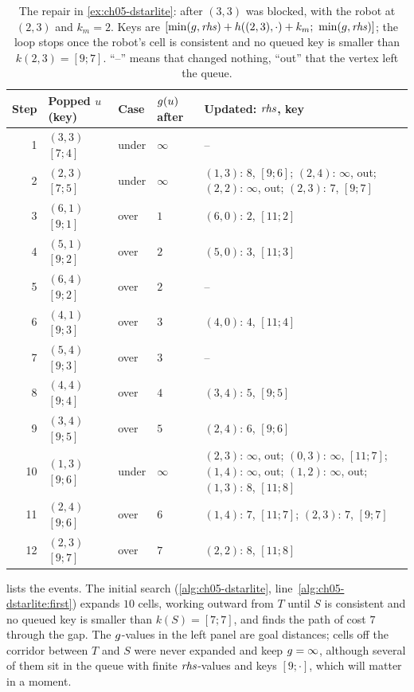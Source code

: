 \begin{table}[htbp]
  \centering\footnotesize
  \caption{The repair in \cref{ex:ch05-dstarlite}: \protect\DslComputeShortestPath after $(3,3)$
  was blocked, with the robot at $(2,3)$ and $k_m=2$. Keys are
  $[\min(\gcost,\rhs)+\hcost((2,3),\cdot)+k_m;\ \min(\gcost,\rhs)]$; the loop stops once
  the robot's cell is consistent and no queued key is smaller than $k(2,3)=[9;7]$.
  ``--'' means that \protect\DslUpdateVertex changed nothing, ``out'' that the vertex left the
  queue.}
  \label{tab:ch05-dstarlite-repair}
  \begin{tabular}{@{}rlllL{6.6cm}@{}}
  \toprule
  Step & Popped $u$ (key) & Case & $g(u)$ after & Updated: $\mathit{rhs}$, key\\
   & $(3,3)$ $[7;4]$ & under & $\infty$ & --\\
  2 & $(2,3)$ $[7;5]$ & under & $\infty$ & $(1,3)$: $8$, $[9;6]$; $(2,4)$: $\infty$, out; $(2,2)$: $\infty$, out; $(2,3)$: $7$, $[9;7]$\\
  3 & $(6,1)$ $[9;1]$ & over & $1$ & $(6,0)$: $2$, $[11;2]$\\
  4 & $(5,1)$ $[9;2]$ & over & $2$ & $(5,0)$: $3$, $[11;3]$\\
  5 & $(6,4)$ $[9;2]$ & over & $2$ & --\\
  6 & $(4,1)$ $[9;3]$ & over & $3$ & $(4,0)$: $4$, $[11;4]$\\
  7 & $(5,4)$ $[9;3]$ & over & $3$ & --\\
  8 & $(4,4)$ $[9;4]$ & over & $4$ & $(3,4)$: $5$, $[9;5]$\\
  9 & $(3,4)$ $[9;5]$ & over & $5$ & $(2,4)$: $6$, $[9;6]$\\
  10 & $(1,3)$ $[9;6]$ & under & $\infty$ & $(2,3)$: $\infty$, out; $(0,3)$: $\infty$, $[11;7]$; $(1,4)$: $\infty$, out; $(1,2)$: $\infty$, out; $(1,3)$: $8$, $[11;8]$\\
  11 & $(2,4)$ $[9;6]$ & over & $6$ & $(1,4)$: $7$, $[11;7]$; $(2,3)$: $7$, $[9;7]$\\
  12 & $(2,3)$ $[9;7]$ & over & $7$ & $(2,2)$: $8$, $[11;8]$\\
  \bottomrule
  \end{tabular}
\end{table}

 lists the events. The initial search
(\cref{alg:ch05-dstarlite}, line~\ref{alg:ch05-dstarlite:first}) expands $10$ cells,
working outward from $T$ until $S$ is consistent and no queued key is smaller than
$k(S)=[7;7]$, and finds the path of cost $7$ through the gap. The $g$-values in the
left panel are goal distances; cells off the corridor between $T$ and $S$ were never
expanded and keep $g=\infty$, although several of them sit in the queue with
finite $\mathit{rhs}$-values and keys $[9;\cdot]$, which will matter in a moment.

